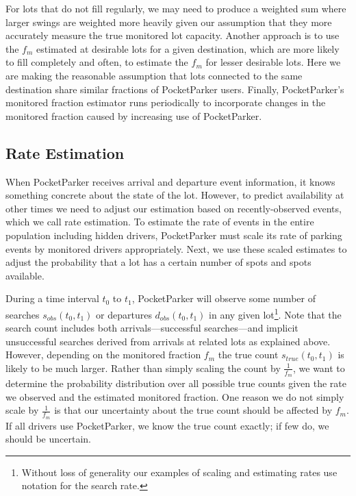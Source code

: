 \documentclass{sigchi}
\begin{document}
For lots that do not fill regularly, we may need to produce a
weighted sum where larger swings are weighted more heavily given our
assumption that they more accurately measure the true monitored lot capacity. 
Another approach is to use the $f_m$ estimated at
desirable lots for a given destination, which are more likely to fill
completely and often, to estimate the $f_m$ for
lesser desirable lots. Here we are making the reasonable assumption that lots
connected to the same destination share similar fractions of PocketParker
users. Finally, PocketParker's monitored fraction estimator runs periodically
to incorporate changes in the monitored fraction caused by increasing use of
PocketParker.

\subsection{Rate Estimation}

When PocketParker receives arrival and departure event information, it knows
something concrete about the state of the lot. However, to predict
availability at other times we need to adjust our estimation based on
recently-observed events, which we call rate estimation. To estimate the rate
of events in the entire population including hidden drivers, PocketParker
must scale its rate of parking events by monitored drivers appropriately.
Next, we use these scaled estimates to adjust the probability that a lot has
a certain number of spots and spots available.

During a time interval $t_0$ to $t_1$, PocketParker will observe some number
of searches $s_{obs}(t_0, t_1)$ or departures $d_{obs}(t_0, t_1)$ in any
given lot\footnote{Without loss of generality our examples of scaling and
estimating rates use notation for the search rate.}. Note that the search
count includes both arrivals---successful searches---and implicit
unsuccessful searches derived from arrivals at related lots as explained
above. However, depending on the monitored fraction $f_m$ the true count
$s_{true}(t_0, t_1)$ is likely to be much larger. Rather than simply scaling
the count by $\frac{1}{f_m}$, we want to determine the probability
distribution over all possible true counts given the rate we observed and the
estimated monitored fraction. One reason we do not simply scale by
$\frac{1}{f_m}$ is that our uncertainty about the true count should be
affected by $f_m$. If all drivers use PocketParker, we know the true count
exactly; if few do, we should be uncertain.
\end{document}
